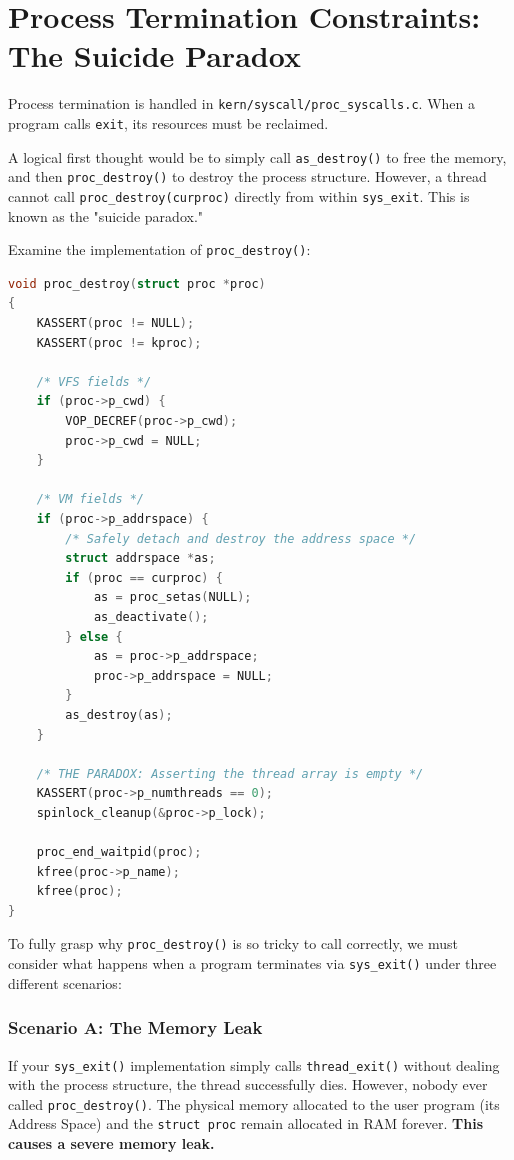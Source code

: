 \section{Process Termination Constraints: The Suicide Paradox}
Process termination is handled in \texttt{kern/syscall/proc\_syscalls.c}. When a program calls \texttt{exit}, its resources must be reclaimed. 

A logical first thought would be to simply call \texttt{as\_destroy()} to free the memory, and then \texttt{proc\_destroy()} to destroy the process structure. However, a thread cannot call \texttt{proc\_destroy(curproc)} directly from within \texttt{sys\_exit}. This is known as the "suicide paradox."

Examine the implementation of \texttt{proc\_destroy()}:
\begin{lstlisting}[language=C]
void proc_destroy(struct proc *proc)
{
	KASSERT(proc != NULL);
	KASSERT(proc != kproc);

	/* VFS fields */
	if (proc->p_cwd) {
		VOP_DECREF(proc->p_cwd);
		proc->p_cwd = NULL;
	}

	/* VM fields */
	if (proc->p_addrspace) {
        /* Safely detach and destroy the address space */
		struct addrspace *as;
		if (proc == curproc) {
			as = proc_setas(NULL);
			as_deactivate();
		} else {
			as = proc->p_addrspace;
			proc->p_addrspace = NULL;
		}
		as_destroy(as);
	}

    /* THE PARADOX: Asserting the thread array is empty */
	KASSERT(proc->p_numthreads == 0);
	spinlock_cleanup(&proc->p_lock);

	proc_end_waitpid(proc);
	kfree(proc->p_name);
	kfree(proc);
}
\end{lstlisting}

To fully grasp why \texttt{proc\_destroy()} is so tricky to call correctly, we must consider what happens when a program terminates via \texttt{sys\_exit()} under three different scenarios:

\subsubsection*{Scenario A: The Memory Leak}
If your \texttt{sys\_exit()} implementation simply calls \texttt{thread\_exit()} without dealing with the process structure, the thread successfully dies. However, nobody ever called \texttt{proc\_destroy()}. The physical memory allocated to the user program (its Address Space) and the \texttt{struct proc} remain allocated in RAM forever. \textbf{This causes a severe memory leak.}

